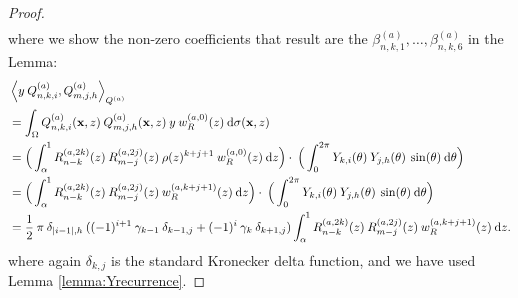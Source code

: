 \documentclass[11pt, oneside]{article}   	%
\newcommand{\half}{\frac{1}{2}}
\newcommand{\genjac}{R}
\newcommand{\genjacnmk}{\genjac_{n-k}}
\newcommand{\genjacmmj}{\genjac_{m-j}}
\newcommand{\genjacw}{w_\genjac}
\newcommand{\scop}{Q}
\newcommand{\scopnki}{\scop_{n,k,i}}
\newcommand{\scopmjh}{\scop_{m,j,h}}
\newcommand{\scopa}{\scop^{(a)}}
\newcommand{\scopnkia}{\scopnki^{(a)}}
\newcommand{\scopmjha}{\scopmjh^{(a)}}
\newcommand{\xvec}{\mathbf{x}}
\newcommand{\ch}{Y}
\newcommand{\chki}{\ch_{k,i}}
\newcommand{\chjh}{\ch_{j,h}}
\newcommand{\betaa}{\beta^{(a)}}
\begin{document}
\begin{proof}
\begin{align*}
\end{align*}
where we show the non-zero coefficients that result are the $\betaa_{n,k,1},\dots,\betaa_{n,k,6}$ in the Lemma:
\begin{align*}
	&\ip<y \: \scopnkia, \scopmjha>_{\scopa} \\
	&= \int_\Omega \scopnkia(\xvec,z) \: \scopmjha(\xvec,z) \: y \: \genjacw^{(a,0)}(z) \: \D\sigma(\xvec, z) \\
	&= \Big( \int^1_\alpha \genjacnmk^{(a, 2k)}(z) \: \genjacmmj^{(a, 2j)}(z) \: \rho(z)^{k+j+1} \: \genjacw^{(a, 0)}(z) \: \D z \Big) \cdot \: \Big( \int_0^{2\pi} \chki(\theta) \: \chjh(\theta) \: \sin(\theta) \: \D \theta \Big) \\
	&= \Big( \int^1_\alpha \genjacnmk^{(a, 2k)}(z) \: \genjacmmj^{(a, 2j)}(z) \: \genjacw^{(a, k + j + 1)}(z) \: \D z \Big) \cdot \: \Big( \int_0^{2\pi} \chki(\theta) \: \chjh(\theta) \: \sin(\theta) \: \D \theta \Big) \\
	&= \half \: \pi \: \delta_{|i-1|,h} \: ((-1)^{i+1} \: \gamma_{k-1} \: \delta_{k-1, j} + (-1)^i \: \gamma_{k} \: \delta_{k+1, j})  \int^1_\alpha \genjacnmk^{(a, 2k)}(z) \: \genjacmmj^{(a, 2j)}(z) \: \genjacw^{(a, k + j + 1)}(z) \: \D z.
\end{align*}
where again $\delta_{k, j}$ is the standard Kronecker delta function, and we have used Lemma \ref{lemma:Yrecurrence}.

\end{proof}
\end{document}
